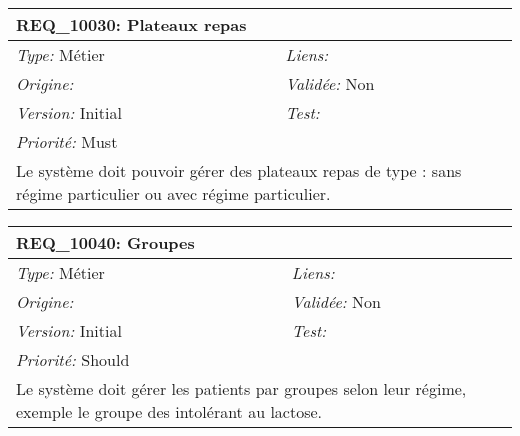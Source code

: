 \begin{table}[!h]

\begin{tabular}{|p{60mm}p{100mm}|}

\hline

\multicolumn{2}{|l|}{\textbf{REQ\_10030:} Plateaux repas} \\ \hline

\emph{Type:} Métier & \emph{Liens:}  \\

\emph{Origine:}  & \emph{Validée:} Non \\

\emph{Version:} Initial & \emph{Test:}  \\

\emph{Priorité:} Must & \\ \hline

\multicolumn{2}{|p{16cm}|}{Le système doit pouvoir gérer des plateaux repas de type : sans régime particulier ou avec régime particulier.} \\ \hline

\end{tabular}

\end{table}



\begin{table}[!h]

\begin{tabular}{|p{60mm}p{100mm}|}

\hline

\multicolumn{2}{|l|}{\textbf{REQ\_10040:} Groupes} \\ \hline

\emph{Type:} Métier & \emph{Liens:}  \\

\emph{Origine:}  & \emph{Validée:} Non \\

\emph{Version:} Initial & \emph{Test:}  \\

\emph{Priorité:} Should & \\ \hline

\multicolumn{2}{|p{16cm}|}{Le système doit gérer les patients par groupes selon leur régime, exemple le groupe des intolérant au lactose.} \\ \hline

\end{tabular}

\end{table}



